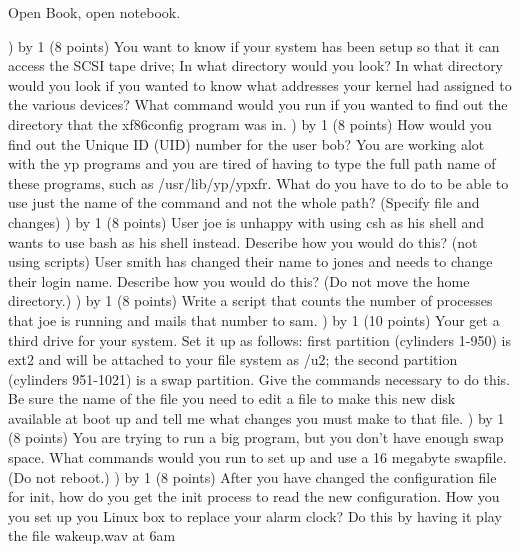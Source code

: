 
\parindent=0in
\nopagenumbers
\newcount\quesno
{}
\def\ques{\number\quesno) \advance\quesno by 1}
\def\aspace{\vskip 1.5in}

Open Book, open notebook.

\ques
(8 points)
You want to know if your system has been setup so that it can
access the SCSI tape drive;
In what directory would you look?
\vskip 0.5in
In what directory would you look if you wanted to know what addresses
your kernel had assigned to the various devices?
\vskip 0.5in
What command would you run if you wanted to find out the directory
that the {\ltt{}xf86config} program was in.
\vskip 0.5in
\ques
(8 points)
How would you find out the Unique ID (UID) number for the user bob?
\vskip 0.5in
You are working alot with the {\ltt{}yp} programs and you are tired of 
having to type the full path name of these programs, 
such as {\ltt{}/usr/lib/yp/ypxfr}.
What do you have to do to be able to use just the name of the command
and not the whole path? (Specify file and changes)
\vskip 1.8in
\ques
(8 points)
User {\ltt{}joe} is unhappy with using {\ltt{}csh} as his shell and wants
to use {\ltt{}bash} as his shell instead.
Describe how you would do this? (not using scripts)
\vskip 0.8in
User {\ltt{}smith} has changed their name to {\ltt{}jones} and needs
to change their login name.
Describe how you would do this?
(Do not move the home directory.)
\vfill\eject
\ques
(8 points)
Write a script that counts the number of processes that {\ltt{}joe}
is running and mails that number to {\ltt{}sam}.
\vskip 2.8in
\ques
(10 points)
Your get a third drive for your system.
Set it up as follows: first partition (cylinders 1-950) is ext2 and
will be attached to your file system as {\ltt{}/u2};
the second partition (cylinders 951-1021) is a swap partition.
Give the commands necessary to do this. Be sure the name of the file
you need to edit a file to make this new disk available at boot
up and tell me what changes you must make to that file.
\vskip 3.8in
\ques
(8 points)
You are trying to run a big program, but you don't have enough swap space.
What commands would you run to set up and use a 16 megabyte swapfile.
(Do not reboot.)
\vfill\eject
\ques
(8 points)
After you have changed the configuration file for {\ltt{}init},
how do you get the {\ltt{}init} process to read the new configuration.
\vskip 0.5in
How you you set up you Linux box to replace your alarm clock?
Do this by having it play the file {\ltt{}wakeup.wav} at 6am
